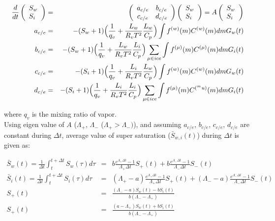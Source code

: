 \begin{eqnarray}
\frac{d}{dt}\left(
\begin{array}{l}
S_{w}\\
S_{i}\\
\end{array}\right )
&=&
\left(
\begin{array}{cc}
a_{c/e}& b_{c/e}\\
c_{c/e}& d_{c/e}
\end{array}\right)
\left(
\begin{array}{l}
S_{w}\\
S_{i}
\end{array}\right)
=
A
\left(
\begin{array}{l}
S_{w}\\
S_{i}
\end{array}\right)\label{s10-13}\\
a_{c/e}&=&-(S_{w}+1)\Bigl(\frac{1}{q_{v}}+\frac{L_{w}}{R_{v}T^{2}}\frac{L_{w}}{C_{p}}\Bigr )\int f^{(w)}(m)C^{(w)}(m)dm G_{w}(t)\nonumber\\
b_{c/e}&=&-(S_{w}+1)\Bigl(\frac{1}{q_{v}}+\frac{L_{w}}{R_{v}T^{2}}\frac{L_{i}}{C_{p}}\Bigr ) \sum_{\mu \in ice}\int f^{(\mu)}(m)C^{(\mu)}(m)dm G_{i}(t)\nonumber\\
c_{c/e}&=&-(S_{i}+1)\Bigl(\frac{1}{q_{v}}+\frac{L_{i}}{R_{v}T^{2}}\frac{L_{w}}{C_{p}}\Bigr ) \int f^{(w)}(m)C^{(w)}(m)dm G_{w}(t)\nonumber\\
d_{c/e}&=&-(S_{i}+1)\Bigl(\frac{1}{q_{v}}+\frac{L_{i}}{R_{v}T^{2}}\frac{L_{i}}{C_{p}}\Bigr ) \sum_{\mu \in ice}\int f^{(\mu)}(m)C^{(^mu)}(m)dm G_{i}(t)\nonumber
\end{eqnarray}


where $q_{v}$ is the mixing ratio of vapor. \\
Using eigen value of $A$ ($\Lambda_{+}$, $\Lambda_{-}$ ($\Lambda_{+}>\Lambda_{-})$), and assuming $a_{c/e}$, $b_{c/e}$, $c_{c/e}$, $d_{c/e}$ are constant during $\Delta t$, average value of super saturation ($\bar{S}_{w,i}(t)$) during $\Delta t$ is given as:

\begin{eqnarray}
\bar{S}_{w}(t)=\frac{1}{\Delta t}\int_{t}^{t+\Delta t}S_{w}(\tau)d\tau&=&b\frac{e^{\Lambda_{+}\Delta t}-1}{\Lambda_{+}\Delta t}S_{+}(t)+b\frac{e^{\Lambda_{-}\Delta t}-1}{\Lambda_{-}\Delta t}S_{-}(t)\nonumber\\
\bar{S}_{i}(t)=\frac{1}{\Delta t}\int_{t}^{t+\Delta t}S_{i}(\tau)d\tau&=&(\Lambda_{+}-a)\frac{e^{\Lambda_{+}\Delta t}-1}{\Lambda_{+}\Delta t}S_{+}(t)+(\Lambda_{-}-a)\frac{e^{\Lambda_{-}\Delta t}-1}{\Lambda_{-}\Delta t}S_{-}(t)\nonumber\\
S_{+}(t)&=&\frac{(\Lambda_{-}-a)S_{w}(t)-bS_{i}(t)}{b(\Lambda_{-}-\Lambda_{+})}\nonumber\\
S_{+}(t)&=&\frac{(a-\Lambda_{+})S_{w}(t)+bS_{i}(t)}{b(\Lambda_{-}-\Lambda_{+})}\nonumber
\end{eqnarray}

